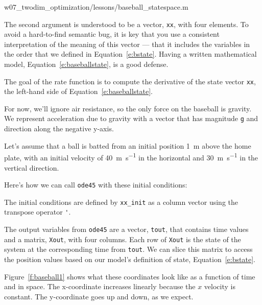 \documentclass[../../book.tex]{subfiles}
\begin{document}

{w07_twodim_optimization/lessons/baseball_statespace.m}

The second argument is understood to be a vector, \lstinline{xx}, with four elements.  To avoid a hard-to-find semantic bug, it is key that you use a consistent interpretation of the meaning of this vector --- that it includes the variables in the order that we defined in Equation~\ref{e:bstate}.  Having a written mathematical model, Equation~\ref{e:baseballstate}, is a good defense.

The goal of the rate function is to compute the derivative of the state vector \lstinline{xx}, the left-hand side of Equation~\ref{e:baseballstate}.

For now, we'll ignore air resistance, so the only force on the baseball is gravity.  We represent acceleration due to gravity with a vector that has magnitude \lstinline{g} and direction along the negative y-axis.

Let's assume that a ball is batted from an initial position \SI{1}{\meter} above the home plate, with an initial velocity of \SI{40}{\meter\per\second} in the horizontal and \SI{30}{\meter\per\second} in the vertical direction.


Here's how we can call \lstinline{ode45} with these initial conditions:



The initial conditions are defined by \lstinline{xx_init} as a column vector using the transpose operator \lstinline{'}.

The output variables from \lstinline{ode45} are a vector, \lstinline{tout}, that contains time values and a matrix, \lstinline{Xout}, with four columns.  Each row of \lstinline{Xout} is the state of the system at the corresponding time from \lstinline{tout}.  We can slice this matrix to access the position values based on our model's definition of state, Equation~\ref{e:bstate}.


Figure~\ref{f:baseball1} shows what these coordinates look like as a function of time and in space.  The x-coordinate increases linearly because the $x$ velocity is constant.  The y-coordinate goes up and down, as we expect.
\end{document}
